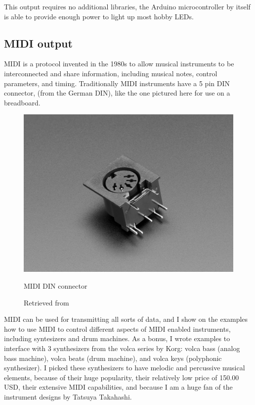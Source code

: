 This output requires no additional libraries, the Arduino microcontroller by itself is able to provide enough power to light up most hobby LEDs.

\subsection{MIDI output}

\acrfull{MIDI} is a protocol invented in the 1980s to allow musical instruments to be interconnected and share information, including musical notes, control parameters, and timing. Traditionally MIDI instruments have a 5 pin  \acrshort{DIN} connector, (from the German \acrlong{DIN}), like the one pictured here for use on a breadboard.

\begin{figure}[ht]
  \centering
  \includegraphics[width=0.75\linewidth,height=0.25\textheight,keepaspectratio]{images/materials-adafruit-midi-jack.jpg}
  \caption{MIDI DIN connector}
  \caption*{Retrieved from \cite{website-materials-adafruit-midi-jack}}
  \label{fig:materials-adafruit-midi-jack}
\end{figure}

MIDI can be used for transmitting all sorts of data, and I show on the examples how to use MIDI to control different aspects of MIDI enabled instruments, including syntesizers and drum machines. As a bonus, I wrote examples to interface with 3 synthesizers from the volca series by Korg: volca bass (analog bass machine), volca beats (drum machine), and volca keys (polyphonic synthesizer). I picked these synthesizers to have melodic and percussive musical elements, because of their huge popularity, their relatively low price of 150.00 USD, their extensive MIDI capabilities, and because I am a huge fan of the instrument designs by Tatsuya Takahashi.

